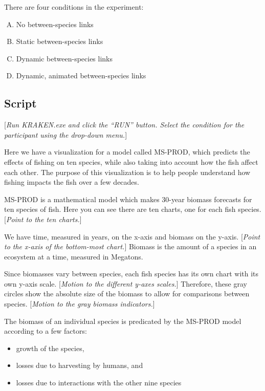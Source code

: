 {{{There are four conditions in the experiment:

\begin{enumerate}[(A)]
\item No between-species links
\item Static between-species links
\item Dynamic between-species links
\item Dynamic, animated between-species links
\end{enumerate}

\subsection{Script}

[\textit{Run KRAKEN.exe and click the ``RUN'' button. Select the condition for the participant using the drop-down menu.}]

Here we have a visualization for a model called MS-PROD, which predicts the effects of fishing on ten species, while also taking into account how the fish affect each other.  The purpose of this visualization is to help people understand how fishing impacts the fish over a few decades.

MS-PROD is a mathematical model which makes 30-year biomass forecasts for ten species of fish.  Here you can see there are ten charts, one for each fish species.  [\textit{Point to the ten charts.}]

We have time, measured in years, on the x-axis and biomass on the y-axis.  [\textit{Point to the x-axis of the bottom-most chart.}]  Biomass is the amount of a species in an ecosystem at a time, measured in Megatons.

Since biomasses vary between species, each fish species has its own chart with its own y-axis scale.  [\textit{Motion to the different y-axes scales.}]  Therefore, these gray circles show the absolute size of the biomass to allow for comparisons between species.  [\textit{Motion to the gray biomass indicators.}]

The biomass of an individual species is predicated by the MS-PROD model according to a few factors:

\begin{itemize}
\item growth of the species,
\item losses due to harvesting by humans, and
\item losses due to interactions with the other nine species
\end{itemize}

}}}
